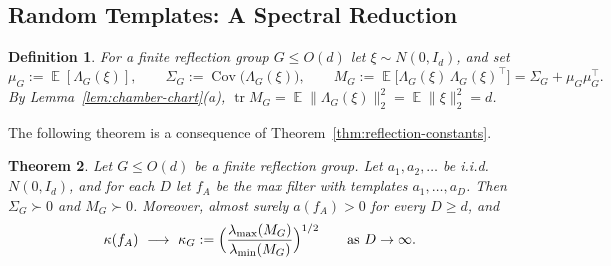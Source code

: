 \documentclass[11pt]{article}
\newtheorem{theor}{Theorem}[section]
\newtheorem{defin}[theor]{Definition}
\theoremstyle{definition}
\DeclareMathOperator{\EX}{\mathbb{E}}
\DeclareMathOperator{\Cov}{Cov}
\begin{document}
\subsection{Random Templates: A Spectral Reduction}

\begin{defin}\label{def:MG}
	For a finite reflection group $G\le O(d)$ let $\xi\sim N(0,I_d)$, and set
	\[
	\mu_G:=\EX[\Lambda_G(\xi)],\qquad
	\Sigma_G:=\Cov\bigl(\Lambda_G(\xi)\bigr),\qquad
	M_G:=\EX\bigl[\Lambda_G(\xi)\,\Lambda_G(\xi)^{\!\top}\bigr]=\Sigma_G+\mu_G^{}\mu_G^{\!\top}.
	\]
	By Lemma~\ref{lem:chamber-chart}(a),
	$\operatorname{tr}M_G=\EX\|\Lambda_G(\xi)\|_2^2=\EX\|\xi\|_2^2=d$.
\end{defin}

The following theorem is a consequence of Theorem~\ref{thm:reflection-constants}.

\begin{theor}
	\label{thm:spectral-limit}
	Let $G\le O(d)$ be a finite reflection group. Let
	$a_1,a_2,\dots$ be i.i.d.\ $N(0,I_d)$, and for each $D$ let $f_A$ be the max filter
	with templates $a_1,\dots,a_D$. Then $\Sigma_G\succ0$ and $M_G\succ0$. Moreover, almost surely $a(f_A)>0$ for every $D\ge d$, and
	\[
	\kappa(f_A)\ \longrightarrow\
	\kappa_G:=\Bigl(\frac{\lambda_{\max}(M_G)}{\lambda_{\min}(M_G)}\Bigr)^{1/2}
	\qquad\text{as }D\to\infty.
	\]
\end{theor}
\end{document}
